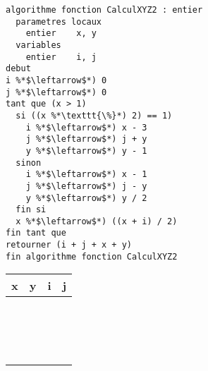 \documentclass[11pt,a4paper]{article}
\begin{document}
\begin{table}[h!]
  \centering
  \begin{minipage}{0.59\textwidth}
    \centering
\begin{lstlisting}[style=algorithmique]
algorithme fonction CalculXYZ2 : entier
  parametres locaux
    entier    x, y
  variables
    entier    i, j
debut
i %*$\leftarrow$*) 0
j %*$\leftarrow$*) 0
tant que (x > 1)
  si ((x %*\texttt{\%}*) 2) == 1)
    i %*$\leftarrow$*) x - 3
    j %*$\leftarrow$*) j + y
    y %*$\leftarrow$*) y - 1
  sinon
    i %*$\leftarrow$*) x - 1
    j %*$\leftarrow$*) j - y
    y %*$\leftarrow$*) y / 2
  fin si
  x %*$\leftarrow$*) ((x + i) / 2)
fin tant que
retourner (i + j + x + y)
fin algorithme fonction CalculXYZ2 \end{lstlisting}
  \end{minipage}
  \hfillx
  \begin{minipage}{0.4\textwidth}
    \centering
    \begin{tabular}{| C{1cm} | C{1cm} | C{1cm} | C{1cm} |}
        \hline
          x  &  y  &  i  &  j    \\
        \hline
             &     &     &       \\
             &     &     &       \\
             &     &     &       \\
        \hline
             &     &     &       \\
             &     &     &       \\
             &     &     &       \\
        \hline
             &     &     &       \\
             &     &     &       \\
             &     &     &       \\
        \hline
             &     &     &       \\
             &     &     &       \\
             &     &     &       \\
        \hline
             &     &     &       \\
             &     &     &       \\
             &     &     &       \\
        \hline
             &     &     &       \\

\end{tabular}
\end{minipage}
\end{table}
\end{document}
